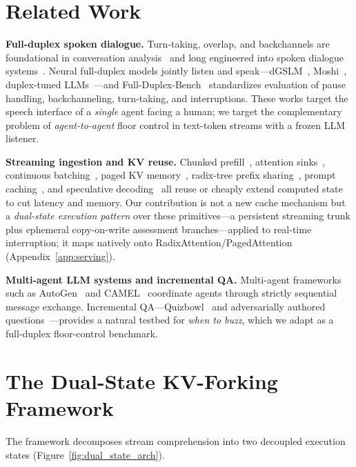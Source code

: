 \documentclass{article}
\begin{document}
\section{Related Work}
\label{sec:related}

\textbf{Full-duplex spoken dialogue.} Turn-taking, overlap, and backchannels are foundational in conversation analysis~\citep{sacks1974turntaking, yngve1970} and long engineered into spoken dialogue systems~\citep{skantze2021review, lin2022duplex}. Neural full-duplex models jointly listen and speak---dGSLM~\citep{nguyen2023dgslm}, Moshi~\citep{defossez2024moshi}, duplex-tuned LLMs~\citep{zhang2024duplexmodels}---and Full-Duplex-Bench~\citep{lin2025fdbench} standardizes evaluation of pause handling, backchanneling, turn-taking, and interruptions. These works target the speech interface of a \emph{single} agent facing a human; we target the complementary problem of \emph{agent-to-agent} floor control in text-token streams with a frozen LLM listener.

\textbf{Streaming ingestion and KV reuse.} Chunked prefill~\citep{agrawal2023sarathi}, attention sinks~\citep{xiao2023streamingllm}, continuous batching~\citep{yu2022orca}, paged KV memory~\citep{kwon2023vllm}, radix-tree prefix sharing~\citep{zheng2023sglang}, prompt caching~\citep{gim2024promptcache}, and speculative decoding~\citep{leviathan2023speculative} all reuse or cheaply extend computed state to cut latency and memory. Our contribution is not a new cache mechanism but a \emph{dual-state execution pattern} over these primitives---a persistent streaming trunk plus ephemeral copy-on-write assessment branches---applied to real-time interruption; it maps natively onto RadixAttention/PagedAttention (Appendix~\ref{app:serving}).

\textbf{Multi-agent LLM systems and incremental QA.} Multi-agent frameworks such as AutoGen~\citep{wu2023autogen} and CAMEL~\citep{li2023camel} coordinate agents through strictly sequential message exchange. Incremental QA---Quizbowl~\citep{rodriguez2021quizbowl} and adversarially authored questions~\citep{wallace2019trick}---provides a natural testbed for \emph{when to buzz}, which we adapt as a full-duplex floor-control benchmark.

\section{The Dual-State KV-Forking Framework}
\label{sec:method}

The framework decomposes stream comprehension into two decoupled execution states (Figure~\ref{fig:dual_state_arch}).
\end{document}
